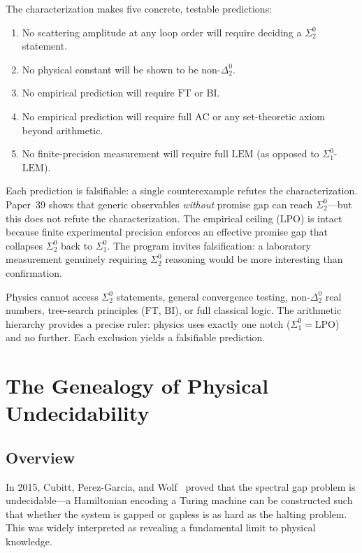 \documentclass[11pt,a4paper]{report}
\theoremstyle{plain}
\theoremstyle{definition}
\theoremstyle{remark}
\newcommand{\LPO}{\mathrm{LPO}}
\newcommand{\FT}{\mathrm{FT}}
\newcommand{\LEM}{\mathrm{LEM}}
\newcommand{\BI}{\mathrm{BI}}
\newcommand{\AC}{\mathrm{AC}}
\begin{document}
The characterization makes five concrete, testable predictions:
\begin{enumerate}[nosep]
\item No scattering amplitude at any loop order will require deciding a $\Sigma^0_2$ statement.
\item No physical constant will be shown to be non-$\Delta^0_2$.
\item No empirical prediction will require $\FT$ or $\BI$.
\item No empirical prediction will require full $\AC$ or any set-theoretic axiom beyond arithmetic.
\item No finite-precision measurement will require full $\LEM$ (as opposed to $\Sigma^0_1$-$\LEM$).
\end{enumerate}
Each prediction is falsifiable: a single counterexample refutes the characterization. Paper~39 shows that generic observables \emph{without} promise gap can reach $\Sigma^0_2$---but this does not refute the characterization. The empirical ceiling ($\LPO$) is intact because finite experimental precision enforces an effective promise gap that collapses $\Sigma^0_2$ back to $\Sigma^0_1$. The program invites falsification: a laboratory measurement genuinely requiring $\Sigma^0_2$ reasoning would be more interesting than confirmation.

\begin{chapterbox}
Physics cannot access $\Sigma^0_2$ statements, general convergence testing, non-$\Delta^0_2$ real numbers, tree-search principles ($\FT$, $\BI$), or full classical logic. The arithmetic hierarchy provides a precise ruler: physics uses exactly one notch ($\Sigma^0_1 = \LPO$) and no further. Each exclusion yields a falsifiable prediction.
\end{chapterbox}

\chapter{The Genealogy of Physical Undecidability}

\section{Overview}

In 2015, Cubitt, Perez-Garcia, and Wolf~\cite{Cubitt2015} proved that the spectral gap problem is undecidable---a Hamiltonian encoding a Turing machine can be constructed such that whether the system is gapped or gapless is as hard as the halting problem. This was widely interpreted as revealing a fundamental limit to physical knowledge.
\end{document}

